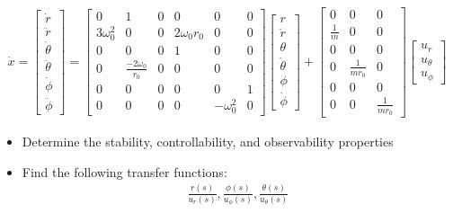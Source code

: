 \documentclass[]{article}
\begin{document}
\begin{align*}
	\dot{x} = \begin{bmatrix}
	\dot{r} \\
	\ddot{r} \\
	\dot{\theta} \\
	\ddot{\theta} \\
	\dot{\phi} \\
	\ddot{\phi}
	\end{bmatrix} = 
	\begin{bmatrix}
	0 & 1 & 0 & 0 & 0 & 0 \\
	3\omega_0^2 & 0 & 0 & 2\omega_0r_0 & 0 & 0 \\
	0 & 0 & 0 & 1 & 0 & 0 \\
	0 & \frac{-2\omega_0 }{r_0} & 0 & 0 & 0 & 0	\\
	0 & 0 & 0 & 0 & 0 & 1 \\
	0 & 0 & 0 & 0 & -\omega_0^2 & 0
	\end{bmatrix}
	\begin{bmatrix}
	r \\
	\dot{r} \\
	\theta \\
	\dot{\theta} \\
	\phi \\
	\dot{\phi}
	\end{bmatrix} + 
	\begin{bmatrix}
	0 & 0 & 0 \\
	\frac{1}{m} & 0 & 0 \\
	0 & 0 & 0 \\
	0 & \frac{1}{mr_0} & 0 \\
	0 & 0 & 0 \\
	0 & 0 & \frac{1}{mr_0}
	\end{bmatrix}
	\begin{bmatrix}
	u_r \\
	u_{\theta} \\
	u_{\phi}
	\end{bmatrix}
\end{align*}

\begin{itemize}
	\item Determine the stability, controllability, and observability properties
	\item Find the following transfer functions:
	\begin{align*}
		\frac{r(s)}{u_r(s)}, \frac{\phi(s)}{u_{\phi}(s)}, \frac{\theta(s)}{u_{\theta}(s)}
	\end{align*}
\end{itemize}
\end{document}
